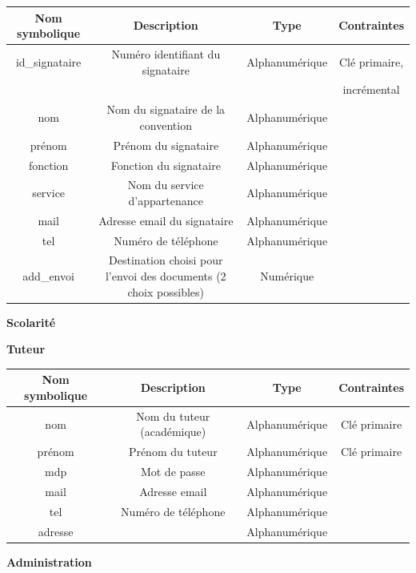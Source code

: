 \documentclass{scrreprt}
\begin{document}
\begin{tabular}{|c|c|c|c|}
\hline
\textbf{Nom symbolique} & \textbf{Description} & \textbf{Type} & \textbf{Contraintes} \\
\hline
id\_signataire & Num\'ero identifiant du signataire & Alphanum\'erique & Cl\'e primaire,\\
&&& incr\'emental \\
nom & Nom du signataire de la convention & Alphanum\'erique & \\
pr\'enom & Pr\'enom du signataire & Alphanum\'erique & \\
fonction & Fonction du signataire & Alphanum\'erique & \\
service & Nom du service d'appartenance & Alphanum\'erique & \\
mail & Adresse email du signataire & Alphanum\'erique & \\
tel & Num\'ero de t\'el\'ephone & Alphanum\'erique & \\
add_envoi & Destination choisi pour l'envoi des documents (2 choix possibles) & Num\'erique &\\
\hline
\end{tabular}

\begin{flushleft}
\textbf{Scolarit\'e}
\end{flushleft}

\newpage
\begin{flushleft}
\textbf{Tuteur}
\end{flushleft}

\begin{tabular}{|c|c|c|c|}
\hline
\textbf{Nom symbolique} & \textbf{Description} & \textbf{Type} & \textbf{Contraintes} \\
\hline
nom & Nom du tuteur (acad\'emique) & Alphanum\'erique & Cl\'e primaire \\
pr\'enom & Pr\'enom du tuteur & Alphanum\'erique & Cl\'e primaire \\
mdp & Mot de passe & Alphanum\'erique & \\
mail & Adresse email & Alphanum\'erique & \\
tel & Num\'ero de t\'el\'ephone & Alphanum\'erique & \\
adresse & & Alphanum\'erique & \\
\hline
\end{tabular}

\begin{flushleft}
\textbf{Administration}
\end{flushleft}
\end{document}
